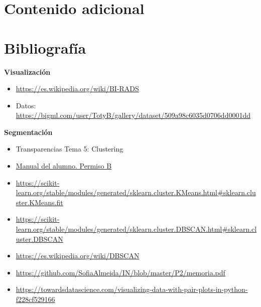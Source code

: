 \documentclass[a4]{article}
\begin{document}
\newpage
\section{Contenido adicional}
\section{Bibliografía}

\textbf{Visualización}
\begin{itemize}
\item \href{https://es.wikipedia.org/wiki/BI-RADS}{https://es.wikipedia.org/wiki/BI-RADS}
\item Datos: \href{https://bigml.com/user/TotyB/gallery/dataset/509a98c6035d0706dd0001dd}{https://bigml.com/user/TotyB/gallery/dataset/509a98c6035d0706dd0001dd}
\end{itemize}
\textbf{Segmentación}
\begin{itemize}
\item Transparencias Tema 5: Clustering
\item \href{https://www.todostuslibros.com/libros/manual-del-alumno-permiso-b-facilauto_978-84-09-08551-4}{Manual del alumno. Permiso B}
\item \href{https://scikit-learn.org/stable/modules/generated/sklearn.cluster.KMeans.html\#sklearn.cluster.KMeans.fit}{https://scikit-learn.org/stable/modules/generated/sklearn.cluster.KMeans.html\#sklearn.cluster.KMeans.fit}
\item \href{https://scikit-learn.org/stable/modules/generated/sklearn.cluster.DBSCAN.html\#sklearn.cluster.DBSCAN}{https://scikit-learn.org/stable/modules/generated/sklearn.cluster.DBSCAN.html\#sklearn.cluster.DBSCAN}
\item \href{https://es.wikipedia.org/wiki/DBSCAN}{https://es.wikipedia.org/wiki/DBSCAN}
\item \href{https://github.com/SofiaAlmeida/IN/blob/master/P2/memoria.pdf}{https://github.com/SofiaAlmeida/IN/blob/master/P2/memoria.pdf}
\item \href{https://towardsdatascience.com/visualizing-data-with-pair-plots-in-python-f228cf529166}{https://towardsdatascience.com/visualizing-data-with-pair-plots-in-python-f228cf529166}
\end{itemize}
\end{document}
